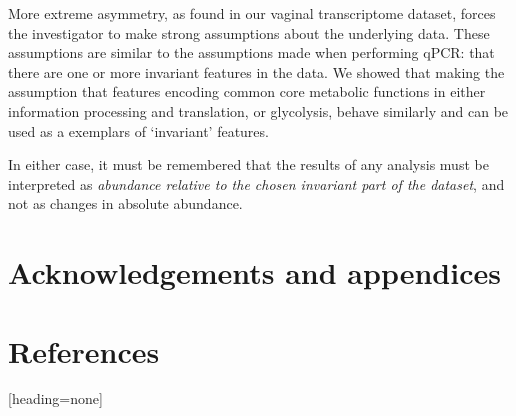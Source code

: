 \documentclass[10pt]{article}
\renewcommand{\refname}{\centerline{REFERENCES}}
\begin{document}
More extreme asymmetry, as found in our vaginal transcriptome dataset, forces the investigator to make strong assumptions about the underlying data. These assumptions are similar to the assumptions made when performing qPCR: that there are one or more invariant features in the data. We showed that making the assumption that features encoding common core metabolic functions in either information processing and translation, or glycolysis, behave similarly and can be used as a exemplars of `invariant' features. 

In either case, it must be remembered that the results of any analysis must be interpreted as \emph{abundance relative to the chosen invariant part of the dataset}, and not as changes in absolute abundance.

\section*{Acknowledgements and appendices}
\vskip-0.25cm

\renewcommand\refname{}
\section*{References}
\vskip-1cm
% 
[heading=none]
\end{document}
